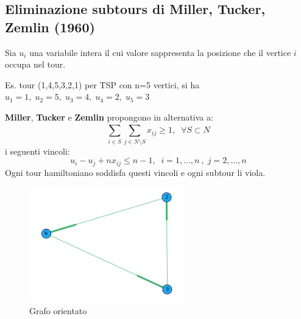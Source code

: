 \subsection{Eliminazione subtours di Miller, Tucker, Zemlin (1960)}
Sia $u_{i}$ una variabile intera il cui valore sappresenta la posizione che il vertice $i$ occupa nel tour.

\begin{center}
	Es. tour (1,4,5,3,2,1) per TSP con n=5 vertici, si ha $u_{1}=1,\;u_{2}=5,\;u_{3}=4,\;u_{4}=2,\;u_{5}=3$	
\end{center}

\textbf{Miller}, \textbf{Tucker} e \textbf{Zemlin} propongono in alternativa a:
\begin{equation}
	\sum_{i\in S}^{}\sum_{j\in N\setminus S}^{} x_{ij} \ge 1,\;\;\forall S\subset N
\end{equation}
i seguenti vincoli:
\begin{equation}
	u_{i}-u_{j}+nx_{ij}\le n-1,\;\; i=1,\dots,n\:,\;j=2,\dots,n
\end{equation}
Ogni tour hamiltoniano soddisfa questi vincoli e ogni subtour li viola.\newline
\begin{figure}
	\vspace{-2em}
	\includegraphics[height=5cm]{images/graph1.png}
	\caption{Grafo orientato}
\end{figure}
\newpage

